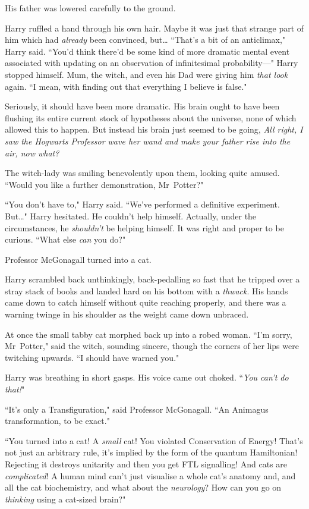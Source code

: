 His father was lowered carefully to the ground.

Harry ruffled a hand through his own hair. Maybe it was just that strange part of him which had \emph{already} been convinced, but{\ldots} ``That's a bit of an anticlimax," Harry said. ``You'd think there'd be some kind of more dramatic mental event associated with updating on an observation of infinitesimal probability—" Harry stopped himself. Mum, the witch, and even his Dad were giving him \emph{that look} again. ``I mean, with finding out that everything I believe is false."

Seriously, it should have been more dramatic. His brain ought to have been flushing its entire current stock of hypotheses about the universe, none of which allowed this to happen. But instead his brain just seemed to be going, \emph{All right, I saw the Hogwarts Professor wave her wand and make your father rise into the air, now what?}

The witch-lady was smiling benevolently upon them, looking quite amused. ``Would you like a further demonstration, Mr~Potter?"

``You don't have to," Harry said. ``We've performed a definitive experiment. But{\ldots}" Harry hesitated. He couldn't help himself. Actually, under the circumstances, he \emph{shouldn't} be helping himself. It was right and proper to be curious. ``What else \emph{can} you do?"

Professor McGonagall turned into a cat.

Harry scrambled back unthinkingly, back-pedalling so fast that he tripped over a stray stack of books and landed hard on his bottom with a \emph{thwack}. His hands came down to catch himself without quite reaching properly, and there was a warning twinge in his shoulder as the weight came down unbraced.

At once the small tabby cat morphed back up into a robed woman. ``I'm sorry, Mr~Potter," said the witch, sounding sincere, though the corners of her lips were twitching upwards. ``I should have warned you."

Harry was breathing in short gasps. His voice came out choked. ``\emph{You can't \emph{do} that!}"

``It's only a Transfiguration," said Professor McGonagall. ``An Animagus transformation, to be exact."

``You turned into a cat! A \emph{small} cat! You violated Conservation of Energy! That's not just an arbitrary rule, it's implied by the form of the quantum Hamiltonian! Rejecting it destroys unitarity and then you get FTL signalling! And cats are \emph{complicated}! A human mind can't just visualise a whole cat's anatomy and, and all the cat biochemistry, and what about the \emph{neurology}? How can you go on \emph{thinking} using a cat-sized brain?"

